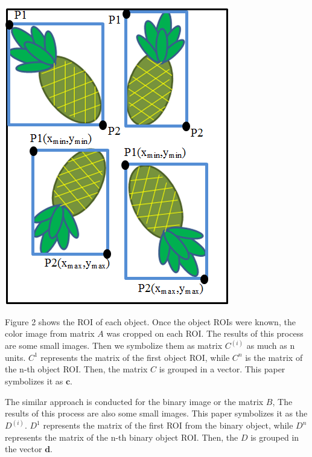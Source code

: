 \documentclass[11pt]{article}
\begin{document}
\begin{linenumbers}
\begin{center}
	\includegraphics[scale=0.65]{images/object-roi}
\end{center}		
Figure 2 shows the ROI of each object. Once the object ROIs were known, the color image from matrix \(A\) was cropped on each ROI. The results of this process are some small images. Then we symbolize them as matrix \(C^{(i)}\) as much as n units. \(C^1\) represents the matrix of the first object ROI, while \(C^n\) is the matrix of the n-th object ROI. Then, the matrix \(C\) is grouped in a vector. This paper symbolizes it as \(\textbf{c}\).

The similar approach is conducted for the binary image or the matrix \(B\), The results of this process are also some small images. This paper symbolizes it as the \(D^{(i)}\). \(D^ 1\) represents the matrix of the first ROI from the binary object, while \(D^n\) represents the matrix of the n-th binary object ROI. Then, the \(D\) is grouped in the vector \(\textbf{d}\).


\end{linenumbers}
\end{document}

